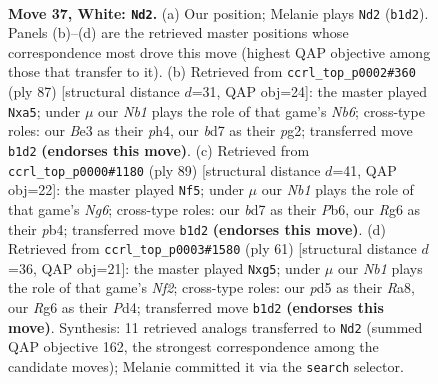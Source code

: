 \documentclass[11pt]{article}
\begin{document}
\clearpage

\begin{figure}[p]\centering
\begin{subfigure}{0.46\textwidth}\centering
\resizebox{\linewidth}{!}{%
\newchessgame
\chessboard[
  setfen={rn6/3bk3/6R1/3p4/1p6/pP2B3/P1P3PK/RN6 w - - 3 37},
  showmover=false,
  pgfstyle=straightmove, color=movearrow, markmove={b1-d2}
]}
\caption{}
\end{subfigure}\hfill
\begin{subfigure}{0.46\textwidth}\centering
\resizebox{\linewidth}{!}{%
\newchessgame
\chessboard[
  setfen={2N5/1r3pk1/p5p1/P2P3p/2R4P/1n3P2/6P1/6K1 b - - 0 44},
  showmover=false,
  pgfstyle=straightmove, color=movearrow, markmove={b3-a5}
]}
\caption{}
\end{subfigure}
\\[4pt]
\begin{subfigure}{0.46\textwidth}\centering
\resizebox{\linewidth}{!}{%
\newchessgame
\chessboard[
  setfen={8/p5rp/Ppp2k2/7P/1P3N2/6n1/1KP2R2/8 b - - 2 45},
  showmover=false,
  pgfstyle=straightmove, color=movearrow, markmove={g3-f5}
]}
\caption{}
\end{subfigure}\hfill
\begin{subfigure}{0.46\textwidth}\centering
\resizebox{\linewidth}{!}{%
\newchessgame
\chessboard[
  setfen={r4k2/5np1/4R3/p1p3P1/2Pp1r2/P2B4/1P6/2KR4 b - - 0 31},
  showmover=false,
  pgfstyle=straightmove, color=movearrow, markmove={f7-g5}
]}
\caption{}
\end{subfigure}
\caption{\textbf{Move 37, White: \texttt{Nd2}.} (a) Our position; Melanie plays \texttt{Nd2} (\texttt{b1d2}). Panels (b)--(d) are the retrieved master positions whose correspondence most drove this move (highest QAP objective among those that transfer to it). (b) Retrieved from \texttt{ccrl\_top\_p0002\#360} (ply 87) [structural distance $d$=31, QAP obj=24]: the master played \texttt{Nxa5}; under $\mu$ our \emph{Nb1} plays the role of that game's \emph{Nb6}; cross-type roles: our \emph{B}e3 as their \emph{p}h4, our \emph{b}d7 as their \emph{p}g2; transferred move \texttt{b1d2} \textbf{(endorses this move)}. (c) Retrieved from \texttt{ccrl\_top\_p0000\#1180} (ply 89) [structural distance $d$=41, QAP obj=22]: the master played \texttt{Nf5}; under $\mu$ our \emph{Nb1} plays the role of that game's \emph{Ng6}; cross-type roles: our \emph{b}d7 as their \emph{P}b6, our \emph{R}g6 as their \emph{p}b4; transferred move \texttt{b1d2} \textbf{(endorses this move)}. (d) Retrieved from \texttt{ccrl\_top\_p0003\#1580} (ply 61) [structural distance $d$=36, QAP obj=21]: the master played \texttt{Nxg5}; under $\mu$ our \emph{Nb1} plays the role of that game's \emph{Nf2}; cross-type roles: our \emph{p}d5 as their \emph{R}a8, our \emph{R}g6 as their \emph{P}d4; transferred move \texttt{b1d2} \textbf{(endorses this move)}. Synthesis: 11 retrieved analogs transferred to \texttt{Nd2} (summed QAP objective 162, the strongest correspondence among the candidate moves); Melanie committed it via the \texttt{search} selector.}
\label{fig:thought-m72}
\end{figure}
\end{document}
